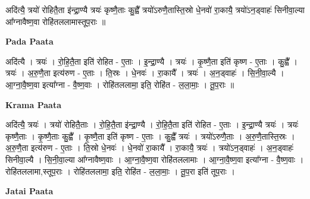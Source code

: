 \documentclass[17pt]{extarticle}
\begin{document}
अदि॑त्यै॒ त्रयो॑ रोहितै॒ता इ॑न्द्रा॒ण्यै त्रयः॑ कृष्णै॒ताः कु॒ह्वै᳚ त्रयो॑ऽरुणै॒तास्ति॒स्रो धे॒नवो॑ रा॒कायै॒ त्रयो॑ऽन॒ड्वाहः॑ सिनीवा॒ल्या आ᳚ग्नावैष्ण॒वा रोहि॑तललामास्तूप॒राः ॥ \newline

\textbf{Pada Paata} \newline

अदि॑त्यै । त्रयः॑ । रो॒हि॒तै॒ता इति॑ रोहित - ए॒ताः । इ॒न्द्रा॒ण्यै । त्रयः॑ । कृ॒ष्णै॒ता इति॑ कृष्ण - ए॒ताः । कु॒ह्वै᳚ । त्रयः॑ । अ॒रु॒णै॒ता इत्य॑रुण - ए॒ताः । ति॒स्रः । धे॒नवः॑ । रा॒कायै᳚ । त्रयः॑ । अ॒न॒ड्वाहः॑ । सि॒नी॒वा॒ल्यै । आ॒ग्ना॒वै॒ष्ण॒वा इत्या᳚ग्ना - वै॒ष्ण॒वाः । रोहि॑तललामा॒ इति॒ रोहि॑त - ल॒ला॒माः॒ । तू॒प॒राः ॥  \newline


\textbf{Krama Paata} \newline

अदि॑त्यै॒ त्रयः॑ । त्रयो॑ रोहितै॒ताः । रो॒हि॒तै॒ता इ॑न्द्रा॒ण्यै । रो॒हि॒तै॒ता इति॑ रोहित - ए॒ताः । इ॒न्द्रा॒ण्यै त्रयः॑ । त्रयः॑ कृष्णै॒ताः । कृ॒ष्णै॒ताः कु॒ह्वै᳚ । कृ॒ष्णै॒ता इति॑ कृष्ण - ए॒ताः । कु॒ह्वै᳚ त्रयः॑ । त्रयो॑ऽरुणै॒ताः । अ॒रु॒णै॒तास्ति॒स्रः । अ॒रु॒णै॒ता इत्य॑रुण - ए॒ताः । ति॒स्रो धे॒नवः॑ । धे॒नवो॑ रा॒कायै᳚ । रा॒कायै॒ त्रयः॑ । त्रयो॑ऽन॒ड्वाहः॑ । अ॒न॒ड्वाहः॑ सिनीवा॒ल्यै । सि॒नी॒वा॒ल्या आ᳚ग्नावैष्ण॒वाः । आ॒ग्ना॒वै॒ष्ण॒वा रोहि॑तललामाः । आ॒ग्ना॒वै॒ष्ण॒वा इत्या᳚ग्ना - वै॒ष्ण॒वाः । रोहि॑तललामा,स्तूप॒राः । रोहि॑तललामा॒ इति॒ रोहि॑त - ल॒ला॒माः॒ । तू॒प॒रा इति॑ तूप॒राः । \newline

\textbf{Jatai Paata} \newline
\end{document}
